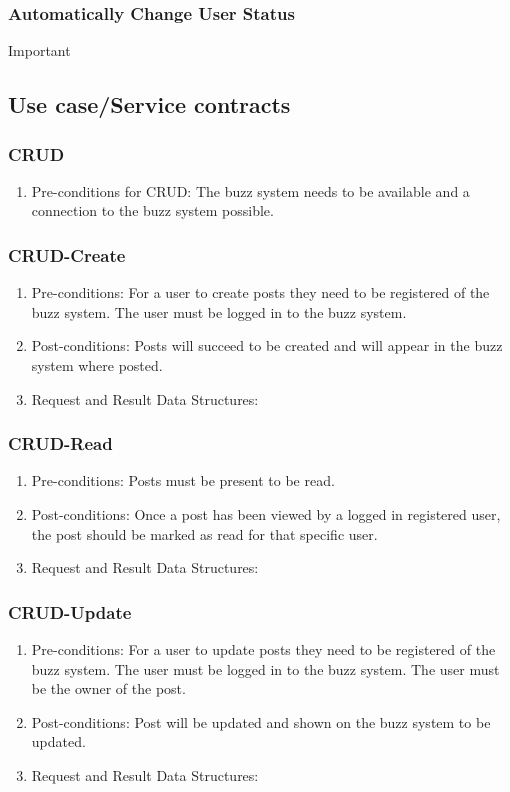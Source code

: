 \documentclass[12pt, oneside]{book}
\begin{document}
\subsubsection{Automatically Change User Status}
Important
\subsection{Use case/Service contracts}
\subsubsection{CRUD}
\begin{enumerate}
 \item Pre-conditions for CRUD: The buzz system needs to be available and a connection to the buzz system possible. 
\end{enumerate}
\subsubsection{CRUD-Create}
\begin{enumerate}
 \item Pre-conditions: For a user to create posts they need to be registered of the buzz system. The user must be logged in to the buzz system.
 \\
 \item Post-conditions: Posts will succeed to be created and will appear in the buzz system where posted.
  \\
 \item Request and Result Data Structures: 
\end{enumerate}

\subsubsection{CRUD-Read}
\begin{enumerate}
 \item Pre-conditions: Posts must be present to be read.
 \\
 \item Post-conditions: Once a post has been viewed by a logged in registered user, the post should be marked as read for that specific user.
  \\
 \item Request and Result Data Structures:
\end{enumerate}

\subsubsection{CRUD-Update}
\begin{enumerate}
 \item Pre-conditions:  For a user to update posts they need to be registered of the buzz system. The user must be logged in to the buzz system. The user must be the owner of the post.
 \\
 \item Post-conditions: Post will be updated and shown on the buzz system to be updated.
   \\
 \item Request and Result Data Structures:
\end{enumerate}
\end{document}

